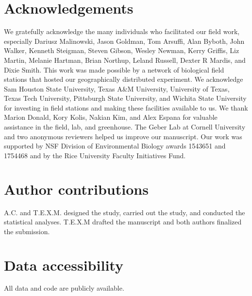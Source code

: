 \documentclass[11pt]{article}\usepackage[]{graphicx}\usepackage[]{color}
\begin{document}
\section*{Acknowledgements}
We gratefully acknowledge the many individuals who facilitated our field work, especially Dariusz Malinowski, Jason Goldman, Tom Arsuffi, Alan Byboth, John Walker, Kenneth Steigman, Steven Gibson, Wesley Newman, Kerry Griffis, Liz Martin, Melanie Hartman, Brian Northup, Leland Russell, Dexter R Mardis, and Dixie Smith. 
This work was made possible by a network of biological field stations that hosted our geographically distributed experiment. 
We acknowledge Sam Houston State University, Texas A\&M University, University of Texas, Texas Tech University, Pittsburgh State University, and Wichita State University for investing in field stations and making these facilities available to us. 
We thank Marion Donald, Kory Kolis, Nakian Kim, and Alex Espana for valuable assistance in the field, lab, and greenhouse. 
The Geber Lab at Cornell University and two anonymous reviewers helped us improve our manuscript. 
Our work was supported by NSF Division of Environmental Biology awards 1543651 and 1754468 and by the Rice University Faculty Initiatives Fund. 

\section*{Author contributions}
A.C. and T.E.X.M. designed the study, carried out the study, and conducted the statistical analyses. 
T.E.X.M drafted the manuscript and both authors finalized the submission.

\section*{Data accessibility}
All data \citep{dryaddata} and code \citep{codepackage} are publicly available.

\newpage



\newpage
\end{document}
